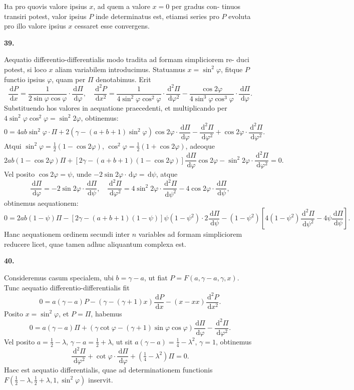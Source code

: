\documentclass[12pt,a4paper]{article}
\newcommand{\dd}{\,\mathrm{d}}
\begin{document}
Ita pro quovis valore ipsius $x$, ad quem a valore $x = 0$ per gradus con-
tinuos transiri potest, valor ipsius $P$ inde determinatus est, etiamsi series pro
$P$ evoluta pro illo valore ipsius $x$ cessaret esse convergens.

\textbf{39.}

Aequatio differentio-differentialis modo tradita ad formam simpliciorem re-
duci potest, si loco $x$ aliam variabilem introducimus. Statuamus $x = \sin^2 \varphi$,
fitque $P$ functio ipsius $\varphi$, quam per $\Pi$ denotabimus. Erit
\[
\frac{\dd P}{\dd x} = \frac{1}{2 \sin \varphi \cos \varphi} \cdot \frac{\dd \Pi}{\dd \varphi}, \quad
\frac{\dd^2 P}{\dd x^2} = \frac{1}{4 \sin^2 \varphi \cos^2 \varphi} \cdot \frac{\dd^2 \Pi}{\dd \varphi^2} - \frac{\cos 2\varphi}{4 \sin^3 \varphi \cos^3 \varphi} \cdot \frac{\dd \Pi}{\dd \varphi}.
\]
Substituendo hos valores in aequatione praecedenti, et multiplicando per
$4 \sin^2 \varphi \cos^2 \varphi = \sin^2 2\varphi$, obtinemus:
\[
0 = 4ab \sin^2 \varphi \cdot \Pi + 2(\gamma - (a+b+1) \sin^2 \varphi) \cos 2\varphi \cdot \frac{\dd \Pi}{\dd \varphi} - \frac{\dd^2 \Pi}{\dd \varphi^2} + \cos 2\varphi \cdot \frac{\dd^2 \Pi}{\dd \varphi^2}.
\]
Atqui $\sin^2 \varphi = \tfrac{1}{2}(1 - \cos 2\varphi)$, $\cos^2 \varphi = \tfrac{1}{2}(1 + \cos 2\varphi)$, adeoque
\[
2ab(1 - \cos 2\varphi) \Pi + [2\gamma - (a+b+1)(1 - \cos 2\varphi)] \frac{\dd \Pi}{\dd \varphi} \cos 2\varphi - \sin^2 2\varphi \cdot \frac{\dd^2 \Pi}{\dd \varphi^2} = 0.
\]
Vel posito $\cos 2\varphi = \psi$, unde $-2 \sin 2\varphi \cdot \dd \varphi = \dd \psi$, atque
\[
\frac{\dd \Pi}{\dd \varphi} = -2 \sin 2\varphi \cdot \frac{\dd \Pi}{\dd \psi}, \quad
\frac{\dd^2 \Pi}{\dd \varphi^2} = 4 \sin^2 2\varphi \cdot \frac{\dd^2 \Pi}{\dd \psi^2} - 4 \cos 2\varphi \cdot \frac{\dd \Pi}{\dd \psi},
\]
obtinemus aequationem:
\[
0 = 2ab(1 - \psi) \Pi - [2\gamma - (a+b+1)(1-\psi)] \psi (1-\psi^2) \cdot 2 \frac{\dd \Pi}{\dd \psi} - (1-\psi^2) \left[4(1-\psi^2) \frac{\dd^2 \Pi}{\dd \psi^2} - 4\psi \frac{\dd \Pi}{\dd \psi}\right].
\]
Hanc aequationem ordinem secundi inter $n$ variables ad formam simpliciorem reducere licet, quae tamen adhuc aliquantum complexa est.

\textbf{40.}

Consideremus casum specialem, ubi $b = \gamma - a$, ut fiat $P = F(a, \gamma - a, \gamma, x)$.
Tunc aequatio differentio-differentialis fit
\[
0 = a(\gamma-a) P - (\gamma - (\gamma+1)x) \frac{\dd P}{\dd x} - (x-xx) \frac{\dd^2 P}{\dd x^2}.
\]
Posito $x = \sin^2 \varphi$, et $P = \Pi$, habemus
\[
0 = a(\gamma-a) \Pi + (\gamma \cot \varphi - (\gamma+1) \sin \varphi \cos \varphi) \frac{\dd \Pi}{\dd \varphi} - \frac{\dd^2 \Pi}{\dd \varphi^2}.
\]
Vel posito $a = \tfrac{1}{2} - \lambda$, $\gamma - a = \tfrac{1}{2} + \lambda$, ut sit $a(\gamma-a) = \tfrac{1}{4} - \lambda^2$,
$\gamma = 1$, obtinemus
\[
\frac{\dd^2 \Pi}{\dd \varphi^2} + \cot \varphi \cdot \frac{\dd \Pi}{\dd \varphi} + (\tfrac{1}{4} - \lambda^2) \Pi = 0.
\]
Haec est aequatio differentialis, quae ad determinationem functionis $F(\tfrac{1}{2}-\lambda, \tfrac{1}{2}+\lambda, 1, \sin^2 \varphi)$ inservit.
\end{document}
